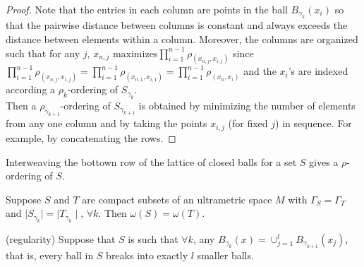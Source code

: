 \begin{proof}
Note that the entries in each column are points in the ball $B_{\gamma_k}(x_i)$ so that the pairwise distance between columns is constant and always exceeds the distance between elements within a column. Moreover, the columns are organized such that for any $j$, $x_{n,j}$ maximizes$\prod_{i=1}^{n-1} \rho_(x_{n,j},x_{i,j})$ since $\prod_{i=1}^{n-1} \rho_(x_{n,j},x_{i,j}) = \prod_{i=1}^{n-1} \rho_(x_{n,1},x_{i,1}) = \prod_{i=1}^{n-1} \rho_(x_{n},x_{i})$ and the $x_i$'s are indexed according a $\rho_k$-ordering of $S_{\gamma_k}$.\\

Then a $\rho_{\gamma_{k+1}}$-ordering of $S_{\gamma_{k+1}}$ is obtained by minimizing the number of elements from any one column and by taking the points $x_{i,j}$ (for fixed $j$) in sequence. For example, by concatenating the rows.
\end{proof}

\begin{corollary*}
Interweaving the bottown row of the lattice of closed balls for a set $S$ gives a $\rho$-ordering of $S$. 
\end{corollary*}

\begin{corollary*}
Suppose $S$ and $T$ are compact subsets of an ultrametric space $M$ with $\Gamma_S = \Gamma_T$ and $\mid S_{\gamma_k}\mid =\mid T_{\gamma_k}\mid$, $\forall k$. Then $\omega(S) = \omega(T)$. 
\end{corollary*}

\begin{corollary*}
(regularity) Suppose that $S$ is such that $\forall k$, any $B_{\gamma_k}(x)=\cup_{j=1}^l B_{\gamma_{k+1}}(x_j)$, that is, every ball in $S$ breaks into exactly $l$ smaller balls. 
\end{corollary*}
